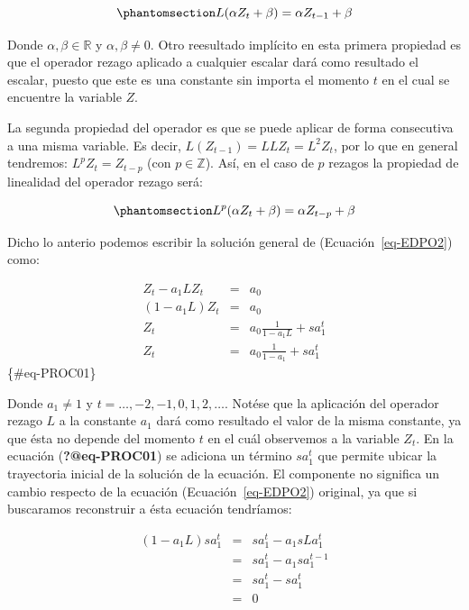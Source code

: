 \documentclass[
  a4paper,
]{article}
\begin{document}
\begin{equation}\phantomsection\label{eq-E1Lag}{
    L(\alpha Z_{t} + \beta) = \alpha Z_{t-1} + \beta
}\end{equation}

Donde \(\alpha, \beta \in \mathbb{R}\) y \(\alpha, \beta \neq 0\). Otro
reesultado implícito en esta primera propiedad es que el operador rezago
aplicado a cualquier escalar dará como resultado el escalar, puesto que
este es una constante sin importa el momento \(t\) en el cual se
encuentre la variable \(Z\).

La segunda propiedad del operador es que se puede aplicar de forma
consecutiva a una misma variable. Es decir,
\(L ( Z_{t-1}) = L L Z_{t} = L^2 Z_{t}\), por lo que en general
tendremos: \(L^p Z_t = Z_{t-p}\) (con \(p \in \mathbb{Z}\)). Así, en el
caso de \(p\) rezagos la propiedad de linealidad del operador rezago
será:

\begin{equation}\phantomsection\label{eq-LinProp}{
    L^p (\alpha Z_{t} + \beta) = \alpha Z_{t-p} + \beta
}\end{equation}

Dicho lo anterio podemos escribir la solución general de
(Ecuación~\ref{eq-EDPO2}) como:

\begin{eqnarray}
    Z_t - a_1 L Z_t & = & a_0 \nonumber \\
    (1 - a_1 L)Z_t & = & a_0 \nonumber \\
    Z_t & = & a_0 \frac{1}{1 - a_1 L} + s a^t_1 \nonumber \\
    Z_t & = & a_0 \frac{1}{1 - a_1} + s a^t_1
\end{eqnarray} \{\#eq-PROC01\}

Donde \(a_1 \neq 1\) y \(t = \ldots, -2, -1, 0, 1, 2, \ldots\). Notése
que la aplicación del operador rezago \(L\) a la constante \(a_1\) dará
como resultado el valor de la misma constante, ya que ésta no depende
del momento \(t\) en el cuál observemos a la variable \(Z_t\). En la
ecuación (\textbf{?@eq-PROC01}) se adiciona un término \(s a^t_1\) que
permite ubicar la trayectoria inicial de la solución de la ecuación. El
componente no significa un cambio respecto de la ecuación
(Ecuación~\ref{eq-EDPO2}) original, ya que si buscaramos reconstruir a
ésta ecuación tendríamos:

\begin{eqnarray}
    (1 - a_1 L) s a^t_1 & = & s a^t_1 - a_1 s L a^{t}_1 \nonumber \\
    & = & s a^t_1 - a_1 s a^{t - 1}_1 \nonumber \\
    & = & s a^t_1 - s a^t_1 \nonumber \\
    & = & 0 \nonumber
\end{eqnarray}
\end{document}
